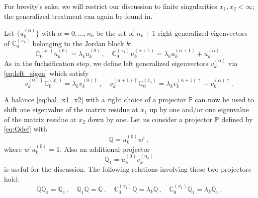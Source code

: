 \documentclass[12pt]{article}
\numberwithin{equation}{section}
\numberwithin{figure}{section}
\newcommand{\C}{\mathds{C}}
\renewcommand{\P}{\mathds{P}}
\newcommand{\Q}{\mathds{Q}}
\begin{document}
        For brevity's sake, we will restrict our discussion to finite singularities $x_1,x_2<\infty$; the generalized treatment can again be found in\cite{Lee:2014ioa}.

        Let $\{u_k^{(\alpha)}\}$ with $\alpha=0,\dots,n_k$ be the set of $n_k+1$ right generalized eigenvectors of $\C^{(x_1)}_0$ belonging to the Jordan block $k$:
        \[
          \C^{(x_1)}_0 u_k^{(0)} = \lambda_k u_k^{(0)}\,, \quad
          \C^{(x_1)}_0 u_k^{(\alpha+1)} = \lambda_k u_k^{(\alpha+1)} + u_k^{(\alpha)}\,.
        \]          
        As in the fuchsification step, we define left generalized eigenvectors $v_k^{(\alpha)}$ via \eqref{eq:left_eigen} which satisfy
        \[
          v_k^{(0)\dagger} \C^{(x_1)}_0 = \lambda_k v_k^{(0)\dagger}\,, \quad
          v_k^{(\alpha+1)\dagger} \C^{(x_1)}_0 = \lambda_k v_k^{(\alpha+1)\dagger} + v_k^{(\alpha)\dagger}\,.
        \]
       
        A balance \eqref{eq:bal_x1_x2} with a right choice of a projector $\P$ can now be used to shift one eigenvalue of the matrix residue at $x_1$ up by one and/or one eigenvalue of the matrix residue at $x_2$ down by one.
        Let us consider a projector $\P$ defined by \eqref{eq:Qdef} with
        \begin{equation} \label{eq:Qnorm}
          \Q = u_k^{(0)} w^\dagger\,,
        \end{equation}
        where $w^\dagger u_k^{(0)} = 1$.
        Also an additional projector
        \[
          \Q_1 = u_k^{(0)} v_k^{(n_k)}
        \]
        is useful for the discussion.
        The following relations involving these two projectors hold:
        \[
          \Q\Q_1 = \Q_1\,, \quad
          \Q_1\Q = \Q\,, \quad
          \C^{(x_1)}_0 \Q = \lambda_k \Q\,, \quad
          \C^{(x_1)}_0 \Q_1 = \lambda_k \Q_1\,.
        \]          
        
\end{document}
